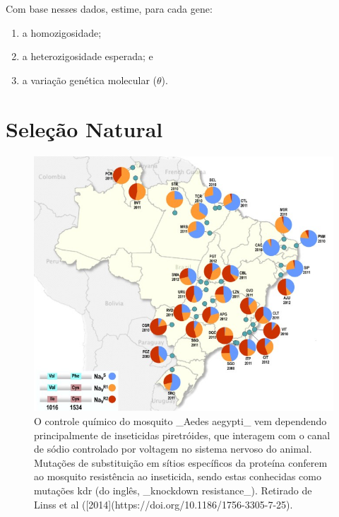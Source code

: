 \documentclass[
]{book}
\begin{document}
Com base nesses dados, estime, para cada gene:

\begin{enumerate}
\def\labelenumi{\alph{enumi}.}
\item
  a homozigosidade;
\item
  a heterozigosidade esperada; e
\item
  a variação genética molecular (\(\theta\)).
\end{enumerate}

\hypertarget{seleuxe7uxe3o-natural}{%
\chapter{Seleção Natural}\label{seleuxe7uxe3o-natural}}

\begin{figure}

{\centering \includegraphics[width=600px]{figs/linssetal2014} 

}

\caption{O controle químico do mosquito _Aedes aegypti_ vem dependendo principalmente de inseticidas piretróides, que interagem com o canal de sódio controlado por voltagem no sistema nervoso do animal. Mutações de substituição em sítios específicos da proteína conferem ao mosquito resistência ao inseticida, sendo estas conhecidas como mutações kdr (do inglês, _knockdown resistance_). Retirado de Linss et al ([2014](https://doi.org/10.1186/1756-3305-7-25).}\label{fig:aedesresistance}
\end{figure}
\end{document}
